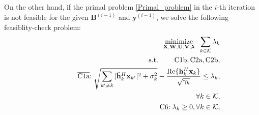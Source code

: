 \documentclass[12pt, draftclsnofoot, onecolumn]{IEEEtran}
\DeclareMathOperator{\mino}{minimize}
\begin{document}
 On the other hand, if the primal problem \eqref{Primal_problem} in the $i$-th iteration is not feasible for the given $\mathbf{B}^{(i-1)}$ and $\mathbf{y}^{(i-1)}$, we solve the following feasiblity-check problem:
\begin{eqnarray}
\label{Feasible_problem}
    &&\hspace*{-6mm}\underset{\mathbf{X},\mathbf{W},\mathbf{U},\mathbf{V},\bm{\lambda}}{\mino}\hspace*{2mm}\sum_{k\in\mathcal{K}}\lambda_k\notag\\
    &&\hspace*{0mm}\mbox{s.t.}\hspace*{8mm}\mbox{C1b},\mbox{C2a},{\mbox{C2b}}, \notag\\
    &&\hspace*{13mm}\overline{\mbox{C1a}}\mbox{:}\hspace*{1mm}\sqrt{\sum_{k'\neq k}|\hat{\mathbf{h}}_k^H\mathbf{x}_{k'}|^2+\sigma_k^2}-\frac{\operatorname{Re}\{{\mathbf{h}}_{k}^H\mathbf{x}_k\}}{\sqrt{\gamma_k}}\leq \lambda_k,\\
    &&\hspace*{21mm}\forall k\in \mathcal{K},\notag\\
    &&\hspace*{13mm}\mbox{C6}\mbox{:}\hspace*{1mm}\lambda_k\geq 0, \forall k\in\mathcal{K}\notag,\vspace*{-2mm}

\end{eqnarray}
\end{document}
